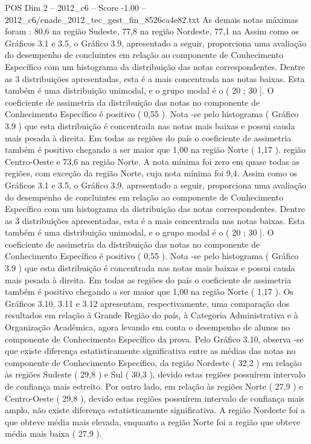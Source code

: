 \begin{textsample}{POS Dim 2 – 2012\_c6 – Score -1.00 – 2012\_c6/enade\_2012\_tec\_gest\_fin\_8526ca4e82.txt}
As demais notas máximas foram : 80,6 na região Sudeste, 77,8 na região Nordeste, 77,1 na Assim como os Gráficos 3.1 e 3.5, o Gráfico 3.9, apresentado a seguir, proporciona uma avaliação do desempenho de concluintes em relação ao componente de Conhecimento Específico com um histograma da distribuição das notas correspondentes.
Dentre as 3 distribuições apresentadas, esta é a mais concentrada nas notas baixas.
Esta também é uma distribuição unimodal, e o grupo modal é o ( 20 ; 30 ].
O coeficiente de assimetria da distribuição das notas no componente de Conhecimento Específico é positivo ( 0,55 ).
Nota -se pelo histograma ( Gráfico 3.9 ) que esta distribuição é concentrada nas notas mais baixas e possui cauda mais pesada à direita.
Em todas as regiões do país o coeficiente de assimetria também é positivo chegando a ser maior que 1,00 na região Norte ( 1,17 ). região Centro-Oeste e 73,6 na região Norte.
A nota mínima foi zero em quase todas as regiões, com exceção da região Norte, cuja nota mínima foi 9,4.
Assim como os Gráficos 3.1 e 3.5, o Gráfico 3.9, apresentado a seguir, proporciona uma avaliação do desempenho de concluintes em relação ao componente de Conhecimento Específico com um histograma da distribuição das notas correspondentes.
Dentre as 3 distribuições apresentadas, esta é a mais concentrada nas notas baixas.
Esta também é uma distribuição unimodal, e o grupo modal é o ( 20 ; 30 ].
O coeficiente de assimetria da distribuição das notas no componente de Conhecimento Específico é positivo ( 0,55 ).
Nota -se pelo histograma ( Gráfico 3.9 ) que esta distribuição é concentrada nas notas mais baixas e possui cauda mais pesada à direita.
Em todas as regiões do país o coeficiente de assimetria também é positivo chegando a ser maior que 1,00 na região Norte ( 1,17 ).
Os Gráficos 3.10, 3.11 e 3.12 apresentam, respectivamente, uma comparação dos resultados em relação à Grande Região do país, à Categoria Administrativa e à Organização Acadêmica, agora levando em conta o desempenho de alunos no componente de Conhecimento Específico da prova.
Pelo Gráfico 3.10, observa -se que existe diferença estatisticamente significativa entre as médias das notas no componente de Conhecimento Específico, da região Nordeste ( 32,2 ) em relação às regiões Sudeste ( 29,8 ) e Sul ( 30,3 ), devido estas regiões possuírem intervalo de confiança mais estreito.
Por outro lado, em relação às regiões Norte ( 27,9 ) e Centro-Oeste ( 29,8 ), devido estas regiões possuírem intervalo de confiança mais amplo, não existe diferença estatisticamente significativa.
A região Nordeste foi a que obteve média mais elevada, enquanto a região Norte foi a região que obteve média mais baixa ( 27,9 ).

\end{textsample}
